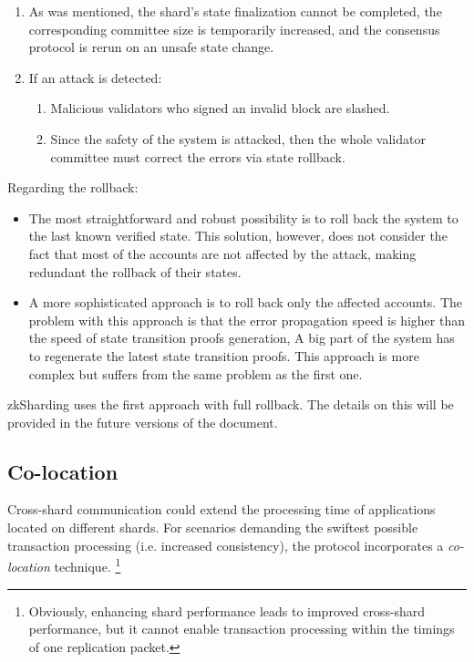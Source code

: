 \begin{enumerate}
\item As was mentioned, the shard's state finalization cannot be completed, the corresponding committee size is temporarily increased, and the consensus protocol is rerun on an unsafe state change.
\item If an attack is detected:
\begin{enumerate}
\item Malicious validators who signed an invalid block are slashed.
\item Since the safety of the system is attacked, then the whole validator committee must correct the errors via state rollback.
\end{enumerate}
\end{enumerate}
Regarding the rollback:

\begin{itemize}
\item The most straightforward and robust possibility is to roll back the system to the last known verified state. This solution, however, does not
consider the fact that most of the accounts are not affected by the attack, making redundant the rollback of their states.
\item A more sophisticated approach is to roll back only the affected accounts.
The problem with this approach is that the error propagation speed is higher than the speed of state transition proofs generation,
A big part of the system has to regenerate the latest state transition proofs.
This approach is more complex but suffers from the same problem as the first one.
\end{itemize}

zkSharding uses the first approach with full rollback. 
The details on this will be provided in the future versions of the document.

\subsection{Co-location}
\label{section:colocation}


Cross-shard communication could extend the processing time 
 of applications located on different shards. 
For scenarios demanding the swiftest possible transaction processing (i.e.
increased consistency), the protocol incorporates a \textit{co-location} technique.
\footnote{Obviously, enhancing shard performance leads to improved cross-shard 
performance, but it cannot enable transaction processing within the timings of one replication packet.}

